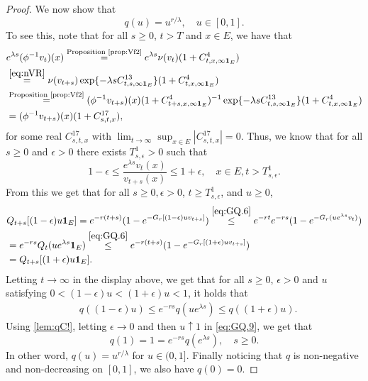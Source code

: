 \documentclass[12pt,a4paper]{amsart}
\numberwithin{equation}{section}
\theoremstyle{plain}
\theoremstyle{definition}
\theoremstyle{remark}
\begin{document}
\begin{proof}
	We now show that
\begin{equation} \label{eq:GQ}
	q(u) = u^{r/\lambda},\quad u\in [0,1].
\end{equation}
To see this, note that for all $s\geq 0$, $t>T$ and $x\in E$, we have that
\begin{align}
	& e^{\lambda s}(\phi^{-1}v_t)(x)
	\overset{\text{Proposition \ref{prop:Vf2}}}= e^{\lambda s}\nu(v_{t})
		(1+ C^4_{t,x,\infty \mathbf 1_E})
	\\&\overset{\eqref{eq:nVR}}=\nu(v_{t+s})
	\exp\{-\lambda sC^{13}_{t,s,\infty \mathbf 1_E}\} (1+ C^4_{t,x,\infty \mathbf 1_E})
	\\&\overset{\text{Proposition \ref{prop:Vf2}}}= (\phi^{-1}v_{t+s})(x)
	(1+ C^4_{t+s,x,\infty \mathbf 1_E})^{-1} \exp\{-\lambda sC^{13}_{t,s,\infty \mathbf 1_E}\} (1+ C^4_{t,x,\infty \mathbf 1_E})
	\\& \label{eq:GQ.5}= (\phi^{-1}v_{t+s})(x) (1+C^{17}_{s,t,x}),
\end{align}
for some real $C_{s,t,x}^{17}$ with $\lim_{t\to \infty}\sup_{x\in E} |C_{s,t,x}^{17}| =0$.
	Thus, we know that for all $s\geq 0$ and $\epsilon >0$ there exists $T^1_{s,\epsilon}>0$ such that
	\begin{equation} \label{eq:GQ.6}
	1-\epsilon
	\leq \frac{e^{\lambda s}v_t(x)}{v_{t+s}(x)}
	\leq 1+\epsilon,
	 \quad x\in E, t> T^1_{s,\epsilon}.
	 \end{equation}
	From this we get that for all $s\geq 0, \epsilon > 0$, $t\ge T^1_{s,\epsilon}$, and $u\geq 0$,
\begin{align}
	& Q_{t+s}[ (1-\epsilon)u \mathbf 1_E ]
	= e^{-r (t+s)}( 1-e^{-G_r[(1-\epsilon)uv_{t+s}]} )
	\overset{\eqref{eq:GQ.6}}\leq e^{-r t} e^{-r s}( 1- e^{-G_r(ue^{\lambda s}v_t)} )
	\\&= e^{-r s}Q_t(ue^{\lambda s} \mathbf 1_E)
	\overset{\eqref{eq:GQ.6}}\leq e^{-r(t+s)}( 1-e^{-G_r[(1+\epsilon)uv_{t+s}]})
	\\&= Q_{t+s}[ (1+\epsilon)u \mathbf 1_E ].
\end{align}
	Letting $t\to \infty$ in the display above, we get that for all $s\geq 0$, $\epsilon > 0$ and $u$ satisfying $0 < (1 - \epsilon) u < (1+\epsilon)u < 1$, it holds that
\begin{align} \label{eq:GQ.9}
	& q((1-\epsilon)u)
	\leq e^{-r s}q(u e^{\lambda s})
	\leq q((1+\epsilon)u).
\end{align}
	Using \eqref{lem:qC!}, letting $\epsilon \to 0$ and then $u \uparrow 1$ in \eqref{eq:GQ.9}, we get that
\[
	q(1)
	=1
	= e^{- r s} q(e^{\lambda s}),
	\quad s \geq 0.
\]
	In other word, $q(u) = u^{r/\lambda}$ for $u\in (0,1]$.
	Finally noticing that $q$ is non-negative and non-decreasing on $[0,1]$, we also have $q(0) = 0$.


\end{proof}
\end{document}
